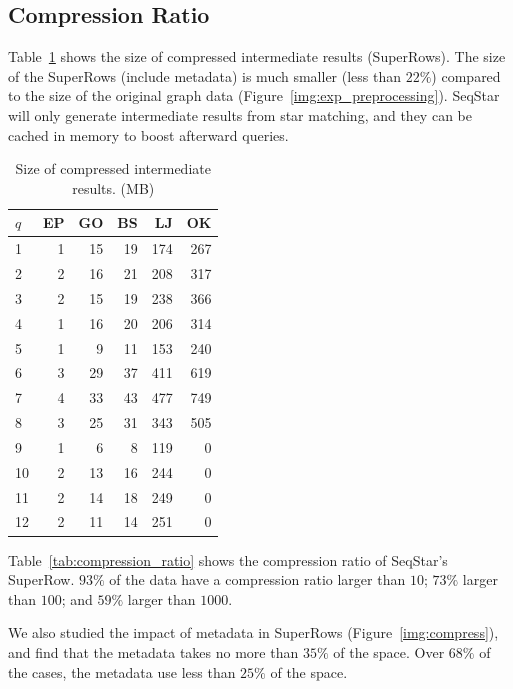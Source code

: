 \subsection{Compression Ratio}\label{sec:experiments_compress}
Table~\ref{tab:compressed} shows the size of compressed intermediate results (SuperRows).
The size of the SuperRows (include metadata) is much smaller (less than $22\%$) compared to the size of the original graph data (Figure~\ref{img:exp_preprocessing}).
SeqStar will only generate intermediate results from star matching,
and they can be cached in memory to boost afterward queries.

\begin{table}
  \caption{Size of compressed intermediate results. (MB)}\label{tab:compressed}
  \begin{tabular}{lrrrrr}
    \toprule
    $q$ &  EP &  GO &  BS &  LJ &  OK \\
    \midrule
    1  &   1 &  15 &  19 & 174 & 267 \\
    2  &   2 &  16 &  21 & 208 & 317 \\
    3  &   2 &  15 &  19 & 238 & 366 \\
    4  &   1 &  16 &  20 & 206 & 314 \\
    5  &   1 &   9 &  11 & 153 & 240 \\
    6  &   3 &  29 &  37 & 411 & 619 \\
    7  &   4 &  33 &  43 & 477 & 749 \\
    8  &   3 &  25 &  31 & 343 & 505 \\
    9  &   1 &   6 &   8 & 119 & 0 \\
    10 &   2 &  13 &  16 & 244 & 0 \\
    11 &   2 &  14 &  18 & 249 & 0 \\
    12 &   2 &  11 &  14 & 251 & 0 \\
    \bottomrule
  \end{tabular}
\end{table}

Table~\ref{tab:compression_ratio} shows the compression ratio of SeqStar's SuperRow.
$93\%$ of the data have a compression ratio larger than $10$;
$73\%$ larger than $100$; and $59\%$ larger than $1000$.

We also studied the impact of metadata in SuperRows (Figure~\ref{img:compress}),
and find that the metadata takes no more than $35\%$ of the space.
Over $68\%$ of the cases, the metadata use less than $25\%$ of the space.

